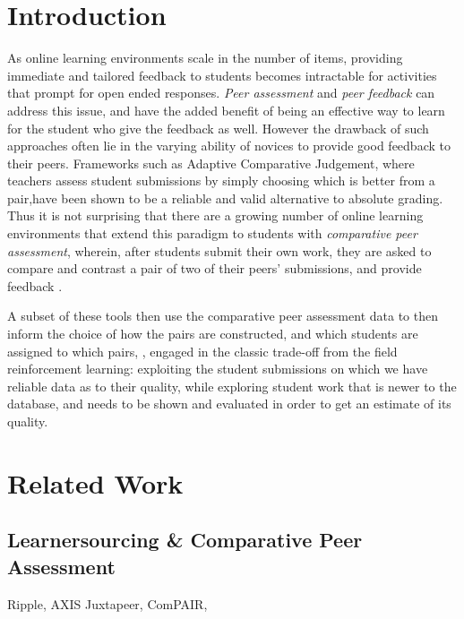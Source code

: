 \documentclass[runningheads]{llncs}
\begin{document}
\section{Introduction}
As online learning environments scale in the number of items, providing 
immediate and tailored feedback to students becomes intractable for activities 
that prompt for open ended responses. \textit{Peer assessment} and \textit{peer 
feedback} can address this issue, and have the added benefit of being an 
effective way to learn for the student who give the feedback as 
well\cite{jhangiani_impact_2016}. 
However the drawback of such approaches often lie in the varying ability of 
novices to provide good feedback to their peers.
Frameworks such as Adaptive Comparative Judgement\cite{pollitt_method_2012}, 
where teachers assess student submissions by simply choosing which is better 
from a pair,have been shown to be a reliable and valid alternative to absolute 
grading.
Thus it is not surprising that there are a growing number of online learning 
environments that extend this paradigm to students with \textit{comparative 
peer assessment}, wherein, after students submit their own work, they are asked 
to compare and contrast a pair of two of their peers' submissions, and provide 
feedback
\cite{univeristy_of_british_columbia_ubc/ubcpi_2019}
\cite{cambre_juxtapeer:_2018}
\cite{potter_compair:_2017}.

A subset of these tools then use the comparative peer assessment data to then 
inform the choice of how the pairs are constructed, and which students are 
assigned to which pairs,
\cite{khosravi_ripple_2019}
\cite{williams_axis:_2016}
\cite{saltise_saltises4/dalite-ng_2019},
engaged in the classic trade-off from the field reinforcement learning: 
exploiting the student submissions on which we have reliable data as to their 
quality, while exploring student work that is newer to the database, and needs 
to be shown and evaluated in order to get an estimate of its quality.



\section{Related Work}
\subsection{Learnersourcing \& Comparative Peer Assessment}
Ripple\cite{khosravi_ripple_2019}, AXIS\cite{williams_axis:_2016}
Juxtapeer\cite{cambre_juxtapeer:_2018}, 
ComPAIR\cite{potter_compair:_2017},\cite{univeristy_of_british_columbia_ubc/ubcpi_2019}
\end{document}
